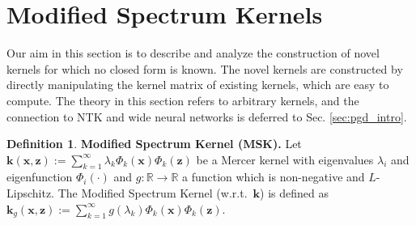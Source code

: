 \documentclass[10pt]{article} %
\theoremstyle{plain}
\theoremstyle{definition}
\newtheorem{definition}[theorem]{Definition}
\theoremstyle{remark}
\newcommand{\Real}{\mathbb{R}}
\newcommand{\vv}{\mathbf{v}}
\newcommand{\x}{\mathbf{x}}
\newcommand{\calx}{\mathcal{X}}
\newcommand{\z}{\mathbf{z}}
\newcommand{\kr}{\boldsymbol{k}}
\begin{document}




\section{Modified Spectrum Kernels} \label{sec:spec_ker}
Our aim in this section is to describe and analyze the construction of novel kernels for which no closed form is known. The novel kernels are constructed by directly manipulating the kernel matrix of existing kernels, which are easy to compute. The theory in this section refers to arbitrary kernels, and the connection to NTK and wide neural networks is deferred to Sec. \ref{sec:pgd_intro}.

\begin{definition} {\bf Modified Spectrum Kernel (MSK).} \label{Def:MSK}
Let $\kr(\x,\z):=\sum_{k=1}^\infty \lambda_k\Phi_k(\x)\Phi_k(\z)$ be a Mercer kernel with eigenvalues $\lambda_i$ and eigenfunction $\Phi_i(\cdot)$ and $g:\Real\to\Real$ a function which is non-negative and $L$-Lipschitz. The Modified Spectrum Kernel (w.r.t.\ $\kr$) is defined as $\kr_g(\x,\z):=\sum_{k=1}^\infty g(\lambda_k)\Phi_k(\x)\Phi_k(\z)$. 
\end{definition}
\end{document}
